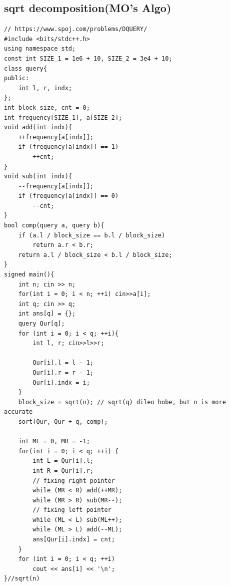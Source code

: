 \subsection{sqrt decomposition(MO's Algo)}
\begin{lstlisting}
// https://www.spoj.com/problems/DQUERY/
#include <bits/stdc++.h>
using namespace std;
const int SIZE_1 = 1e6 + 10, SIZE_2 = 3e4 + 10;
class query{
public:
    int l, r, indx;
};
int block_size, cnt = 0;
int frequency[SIZE_1], a[SIZE_2];
void add(int indx){
    ++frequency[a[indx]];
    if (frequency[a[indx]] == 1)
        ++cnt;
}
void sub(int indx){
    --frequency[a[indx]];
    if (frequency[a[indx]] == 0)
        --cnt;
}
bool comp(query a, query b){
    if (a.l / block_size == b.l / block_size)
        return a.r < b.r;
    return a.l / block_size < b.l / block_size;
}
signed main(){
    int n; cin >> n;
    for(int i = 0; i < n; ++i) cin>>a[i];
    int q; cin >> q;
    int ans[q] = {};
    query Qur[q];
    for (int i = 0; i < q; ++i){
        int l, r; cin>>l>>r;

        Qur[i].l = l - 1;
        Qur[i].r = r - 1;
        Qur[i].indx = i;
    }
    block_size = sqrt(n); // sqrt(q) dileo hobe, but n is more accurate
    sort(Qur, Qur + q, comp);

    int ML = 0, MR = -1;
    for(int i = 0; i < q; ++i) {
        int L = Qur[i].l;
        int R = Qur[i].r;
        // fixing right pointer
        while (MR < R) add(++MR);
        while (MR > R) sub(MR--);
        // fixing left pointer
        while (ML < L) sub(ML++);
        while (ML > L) add(--ML);
        ans[Qur[i].indx] = cnt;
    }
    for (int i = 0; i < q; ++i)
        cout << ans[i] << '\n';
}//sqrt(n)
\end{lstlisting}
